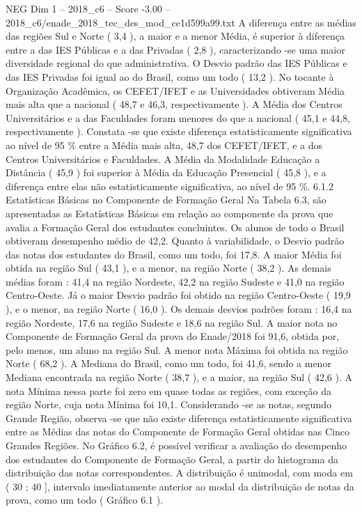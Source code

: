 \begin{textsample}{NEG Dim 1 – 2018\_c6 – Score -3.00 – 2018\_c6/enade\_2018\_tec\_des\_mod\_ce1d599a99.txt}
A diferença entre as médias das regiões Sul e Norte ( 3,4 ), a maior e a menor Média, é superior à diferença entre a das IES Públicas e a das Privadas ( 2,8 ), caracterizando -se uma maior diversidade regional do que administrativa.
O Desvio padrão das IES Públicas e das IES Privadas foi igual ao do Brasil, como um todo ( 13,2 ).
No tocante à Organização Acadêmica, os CEFET/IFET e as Universidades obtiveram Média mais alta que a nacional ( 48,7 e 46,3, respectivamente ).
A Média dos Centros Universitários e a das Faculdades foram menores do que a nacional ( 45,1 e 44,8, respectivamente ).
Constata -se que existe diferença estatisticamente significativa ao nível de 95 \% entre a Média mais alta, 48,7 dos CEFET/IFET, e a dos Centros Universitários e Faculdades.
A Média da Modalidade Educação a Distância ( 45,9 ) foi superior à Média da Educação Presencial ( 45,8 ), e a diferença entre elas não estatisticamente significativa, ao nível de 95 \%. 6.1.2 Estatísticas Básicas no Componente de Formação Geral Na Tabela 6.3, são apresentadas as Estatísticas Básicas em relação ao componente da prova que avalia a Formação Geral dos estudantes concluintes.
Os alunos de todo o Brasil obtiveram desempenho médio de 42,2.
Quanto à variabilidade, o Desvio padrão das notas dos estudantes do Brasil, como um todo, foi 17,8.
A maior Média foi obtida na região Sul ( 43,1 ), e a menor, na região Norte ( 38,2 ).
As demais médias foram : 41,4 na região Nordeste, 42,2 na região Sudeste e 41,0 na região Centro-Oeste.
Já o maior Desvio padrão foi obtido na região Centro-Oeste ( 19,9 ), e o menor, na região Norte ( 16,0 ).
Os demais desvios padrões foram : 16,4 na região Nordeste, 17,6 na região Sudeste e 18,6 na região Sul.
A maior nota no Componente de Formação Geral da prova do Enade/2018 foi 91,6, obtida por, pelo menos, um aluno na região Sul.
A menor nota Máxima foi obtida na região Norte ( 68,2 ).
A Mediana do Brasil, como um todo, foi 41,6, sendo a menor Mediana encontrada na região Norte ( 38,7 ), e a maior, na região Sul ( 42,6 ).
A nota Mínima nessa parte foi zero em quase todas as regiões, com exceção da região Norte, cuja nota Mínima foi 10,1.
Considerando -se as notas, segundo Grande Região, observa -se que não existe diferença estatisticamente significativa entre as Médias das notas do Componente de Formação Geral obtidas nas Cinco Grandes Regiões.
No Gráfico 6.2, é possível verificar a avaliação do desempenho dos estudantes do Componente de Formação Geral, a partir do histograma da distribuição das notas correspondentes.
A distribuição é unimodal, com moda em ( 30 ; 40 ], intervalo imediatamente anterior ao modal da distribuição de notas da prova, como um todo ( Gráfico 6.1 ).

\end{textsample}
